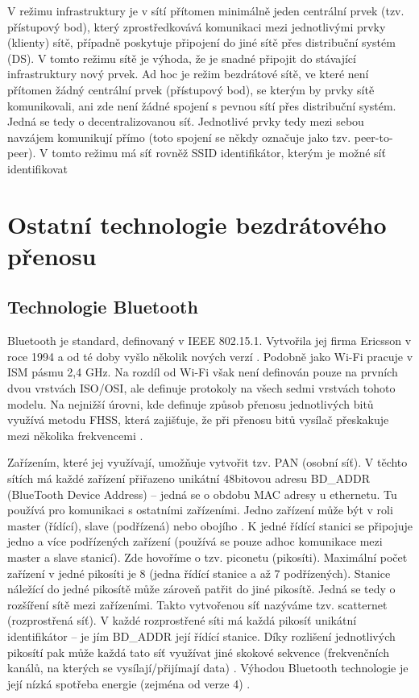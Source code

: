 V režimu infrastruktury je v sítí přítomen minimálně jeden centrální prvek (tzv. přístupový bod), který zprostředkovává komunikaci mezi jednotlivými prvky (klienty) sítě, případně poskytuje připojení do jiné sítě přes distribuční systém (DS). V tomto režimu sítě je výhoda, že je snadné připojit do stávající infrastruktury nový prvek. \newline
Ad hoc je režim bezdrátové sítě, ve které není přítomen žádný centrální prvek (přístupový bod), se kterým by prvky sítě komunikovali, ani zde není žádné spojení s pevnou sítí přes distribuční systém. Jedná se tedy o decentralizovanou síť. Jednotlivé prvky tedy mezi sebou navzájem komunikují přímo (toto spojení se někdy označuje jako tzv. peer-to-peer). V tomto režimu má síť rovněž SSID identifikátor, kterým je možné síť identifikovat \cite{BezdratoveSite}

\section{Ostatní technologie bezdrátového přenosu}
\subsection*{Technologie Bluetooth}
Bluetooth je standard, definovaný v IEEE 802.15.1. Vytvořila jej firma Ericsson v roce 1994 a od té doby vyšlo několik nových verzí \cite{4technologie}. Podobně jako Wi-Fi pracuje v ISM pásmu 2,4 GHz. Na rozdíl od Wi-Fi však není definován pouze na prvních dvou vrstvách ISO/OSI, ale definuje protokoly na všech sedmi vrstvách tohoto modelu. Na nejnižší úrovni, kde definuje způsob přenosu jednotlivých bitů využívá metodu FHSS, která zajišťuje, že při přenosu bitů vysílač přeskakuje mezi několika frekvencemi \cite{GettingStartedBluetooth}.

Zařízením, které jej využívají, umožňuje vytvořit tzv. PAN (osobní síť). V těchto sítích má každé zařízení přiřazeno unikátní 48bitovou adresu BD\_ADDR (BlueTooth Device Address) -- jedná se o obdobu MAC adresy u ethernetu. Tu používá pro komunikaci s ostatními zařízeními. Jedno zařízení může být v roli master (řídící), slave (podřízená) nebo obojího \cite{BluetoothGuide}. K jedné řídící stanici se připojuje jedno a více podřízených zařízení (používá se pouze adhoc komunikace mezi master a slave stanicí). Zde hovoříme o tzv. piconetu (pikosíti). Maximální počet zařízení v jedné pikosíti je 8 (jedna řídící stanice a až 7 podřízených). Stanice náležící do jedné pikosítě může zároveň patřit do jiné pikosítě. Jedná se tedy o rozšíření sítě mezi zařízeními. Takto vytvořenou síť nazýváme tzv. scatternet (rozprostřená síť). V každé rozprostřené síti má každá pikosíť unikátní identifikátor – je jím BD\_ADDR její řídící stanice. Díky rozlišení jednotlivých pikosítí pak může každá tato síť využívat jiné skokové sekvence (frekvenčních kanálů, na kterých se vysílají/přijímají data) \cite{WirelessPersonalCommunications}. Výhodou Bluetooth technologie je její nízká spotřeba energie (zejména od verze 4) \cite{IoTProtocols}.

